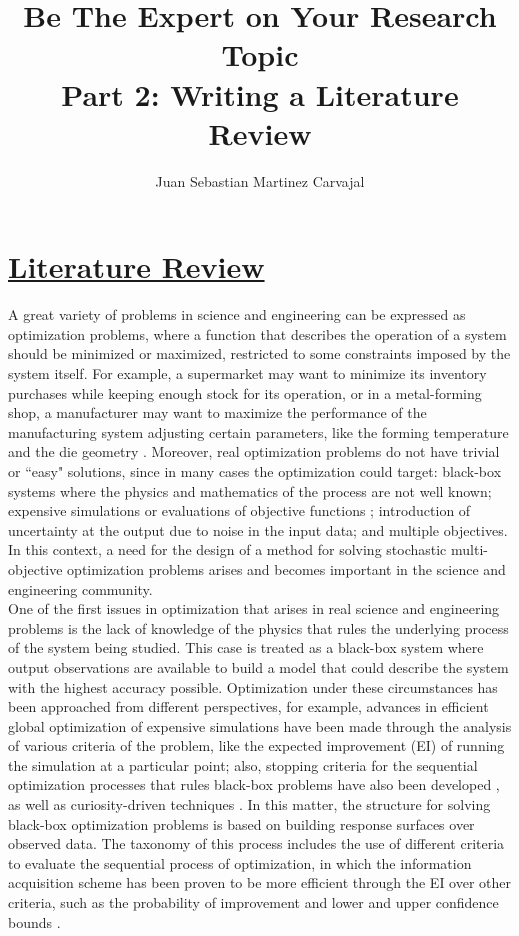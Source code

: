 \documentclass{journal}
\title{\textbf{Be The Expert on Your Research Topic}\\Part 2: Writing a Literature Review}
\author{Juan Sebastian Martinez Carvajal}
\date{}
\begin{document}
\maketitle
\hrulefill

\section{\underline{Literature Review}}

A great variety of problems in science and engineering can be expressed as optimization problems, where a function that describes the operation of a system should be minimized or maximized, restricted to some constraints imposed by the system itself. For example, a supermarket may want to minimize its inventory purchases while keeping enough stock for its operation, or in a metal-forming shop, a manufacturer may want to maximize the performance of the manufacturing system adjusting certain parameters, like the forming temperature and the die geometry \cite{Huang2006}. Moreover, real optimization problems do not have trivial or ``easy" solutions, since in many cases the optimization could target: black-box systems where the physics and mathematics of the process are not well known; expensive simulations or evaluations of objective functions \cite{Jones1998}; introduction of uncertainty at the output due to noise in the input data; and multiple objectives. In this context, a need for the design of a method for solving stochastic multi-objective optimization problems arises and becomes important in the science and engineering community.\\

One of the first issues in optimization that arises in real science and engineering problems is the lack of knowledge of the physics that rules the underlying process of the system being studied. This case is treated as a black-box system where output observations are available to build a model that could describe the system with the highest accuracy possible. Optimization under these circumstances has been approached from different perspectives, for example, advances in efficient global optimization of expensive simulations have been made through the analysis of various criteria of the problem, like the expected improvement (EI) of running the simulation at a particular point; also, stopping criteria for the sequential optimization processes that rules black-box problems have also been developed \cite{Jones1998}, as well as curiosity-driven techniques \cite{Schaul2011}. In this matter, the structure for solving black-box optimization problems is based on building response surfaces over observed data. The taxonomy of this process includes the use of different criteria to evaluate the sequential process of optimization, in which the information acquisition scheme has been proven to be more efficient through the EI over other criteria, such as the probability of improvement and lower and upper confidence bounds \cite{Jones2001}.\\
\end{document}
